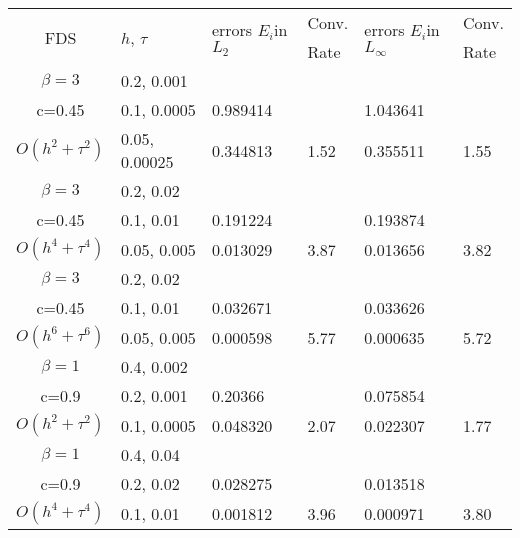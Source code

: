 \documentclass{article}
\begin{document}
\begin{table}[ht]
\centering
\small
		\begin{tabular}{||c|l|ll|ll||}
			\hline
			\hline
      \multirow{2  }{*}{FDS}        & \multirow{2  }{*}{$h$, $\tau$}  & \multirow{2  }{*}{errors $E_i$in$L_2$}  &Conv.& \multirow{2  }{*}{errors $E_i$in$L_\infty$}  &Conv.  \\
	         &                    &                               & Rate   &                                        & Rate \\
   			\hline 
					\hline 
  $\beta=3$                &0.2, 0.001          &              &              &                     &      \\
   c=0.45                     &0.1, 0.0005          &0.989414 &            &1.043641    &       \\
     $O(h^2 + \tau^ 2)$ &0.05, 0.00025   & 0.344813 & 1.52    &0.355511    &  1.55      \\
			\hline 
  $\beta=3$               &0.2, 0.02       &              &            &                     &      \\
   c=0.45                    &0.1, 0.01      &0.191224 &            &0.193874    &       \\
     $O(h^4+ \tau^4)$ &0.05, 0.005&0.013029 & 3.87   &0.013656     &3.82       \\
			\hline 
  $\beta=3$               &0.2, 0.02       &                &            &                     &      \\
     c=0.45                 &0.1, 0.01        &0.032671 &            &  0.033626    &       \\
     $O(h^6+ \tau^6)$ &0.05, 0.005 &0.000598 &5.77     & 0.000635    & 5.72       \\
	   \hline
			\hline 
       $\beta=1$       &0.4, 0.002        &             &            &           &   \\
                  c=0.9    &0.2, 0.001       &  0.20366   &            &0.075854 &   \\
  $O(h^2+ \tau^2)$ &0.1, 0.0005   &0.048320   &2.07  &0.022307  & 1.77 \\
			\hline
      $\beta=1$               &0.4, 0.04    &            &               &             &    \\
       c=0.9                     &0.2, 0.02     & 0.028275   &        &  0.013518   &   \\
       $O(h^4+ \tau^4)$ &0.1, 0.01   &0.001812 & 3.96  & 0.000971  & 3.80  \\

\end{tabular}
\end{table}
\end{document}
